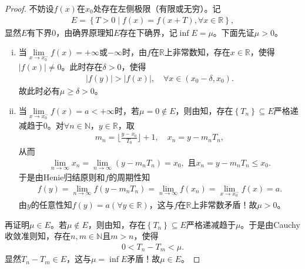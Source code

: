 \documentclass[../../main.tex]{subfiles}%
\begin{document}
\begin{proof}

不妨设$f\left( x \right)$在$x_0$处存在左侧极限（有限或无穷）。记
\begin{align*}
E=\left\{ T>0\mid f\left( x \right) =f\left( x+T \right) ,\forall x\in \mathbb{R} \right\},
\end{align*}
显然$E$有下界$0$，由确界原理知$E$存在下确界，记$\inf\limits_{}E=\mu$。下面先证$\mu >0$。

\begin{enumerate}[(i)]
\item 当$\lim\limits_{x\rightarrow x_{0}^{-}}f\left( x \right) =+\infty$或$-\infty$时，由$f$在$\mathbb{R}$上非常数知，存在$x\in \mathbb{R}$，使得$\left| f\left( x \right) \right|\ne 0$。此时存在$\delta >0$，使得
\begin{align*}
\left| f\left( y \right) \right|>\left| f\left( x \right) \right|,\quad \forall x\in \left( x_0-\delta ,x_0 \right) .
\end{align*}
故此时必有$\mu \geqslant \delta >0$。

\item 当$\lim\limits_{x\rightarrow x_{0}^{-}}f\left( x \right) =a<+\infty$时，若$\mu =0\notin E$，则由知，存在$\left\{ T_n \right\} \subseteq E$严格递减趋于$0$。对$\forall n\in \mathbb{N}$，$y\in \mathbb{R}$，取
\begin{align*}
m_n=\lfloor \frac{y-x_0}{T_0} \rfloor +1,\quad x_n=y-m_nT_n,
\end{align*}
从而
\begin{align*}
\lim\limits_{n\rightarrow \infty}x_n=\lim\limits_{n\rightarrow \infty}\left( y-m_nT_n \right) =x_0,\,\,\text{且}x_n=y-m_nT_n\leqslant x_0.
\end{align*}
于是由Henie归结原则和$f$的周期性知
\begin{align*}
f\left( y \right) =\lim\limits_{n\rightarrow \infty}f\left( y-m_nT_n \right) =\lim\limits_{n\rightarrow \infty}f\left( x_n \right) =\lim\limits_{x\rightarrow x_{0}^{-}}f\left( x \right) =a.
\end{align*}
由$y$的任意性知$f\left( y \right) =a\left( \forall y\in \mathbb{R} \right)$，这与$f$在$\mathbb{R}$上非常数矛盾！故$\mu >0$。
\end{enumerate}

再证明$\mu \in E$。若$\mu \notin E$，则由知，存在$\left\{ T_n \right\} \subseteq E$严格递减趋于$\mu$。于是由Cauchy收敛准则知，存在$n,m\in \mathbb{N}$且$m>n$，使得
\begin{align*}
0<T_n-T_m<\mu .
\end{align*}
显然$T_n-T_m\in E$，这与$\mu =\inf\limits_{}E$矛盾！故$\mu \in E$。

\end{proof}
\end{document}
